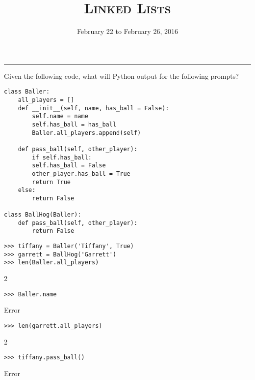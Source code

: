 \documentclass{exam}
\title{\textsc{Linked Lists}}
\date{February 22 to February 26, 2016}
\begin{document}
\maketitle
\rule{\textwidth}{0.15em}
\fontsize{12}{15}\selectfont




\begin{questions}
\begin{blocksection}
\question Given the following code, what will Python output for the following prompts? 

\begin{lstlisting}
class Baller:
	all_players = []
	def __init__(self, name, has_ball = False):
		self.name = name
		self.has_ball = has_ball
		Baller.all_players.append(self)
	
	def pass_ball(self, other_player):
		if self.has_ball:
		self.has_ball = False
		other_player.has_ball = True
		return True
	else:
		return False

class BallHog(Baller):
	def pass_ball(self, other_player):	
		return False	
\end{lstlisting}

\begin{lstlisting}
>>> tiffany = Baller('Tiffany', True)
>>> garrett = BallHog('Garrett')
>>> len(Baller.all_players)
\end{lstlisting}
\begin{solution}[.2in]
2
\end{solution}

\begin{lstlisting}
>>> Baller.name
\end{lstlisting}
\begin{solution}[.2in]
Error
\end{solution}

\begin{lstlisting}
>>> len(garrett.all_players)
\end{lstlisting}
\begin{solution}[.2in]
2
\end{solution}
\end{blocksection}

\begin{blocksection}
\begin{lstlisting}
>>> tiffany.pass_ball()
\end{lstlisting}
\begin{solution}[.2in]
Error
\end{solution}


\end{blocksection}
\end{questions}
\end{document}
